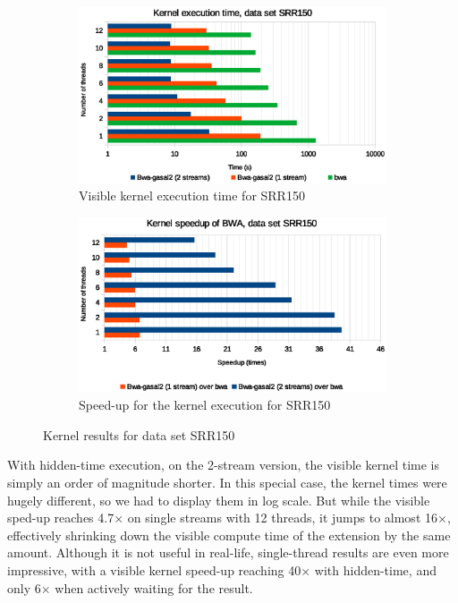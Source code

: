 \begin{figure}[p]
	\centering
	\begin{subfigure}[t]{1\textwidth}
		\centering
		\includegraphics[width=1\textwidth]{srr150/kernel-exec-time-srr150}
		\caption{Visible kernel execution time for SRR150}
		\label{fig:kernel-exec-time-srr150}
	\end{subfigure}%
	
	\begin{subfigure}[b]{1\textwidth}
		\centering
		\includegraphics[width=1\textwidth]{srr150/kernel-exec-speed-up-srr150}
		\caption{Speed-up for the kernel execution for SRR150}
		\label{fig:kernel-exec-speed-up-srr150}
	\end{subfigure}
	\caption{Kernel results for data set SRR150}
\end{figure}

With hidden-time execution, on the 2-stream version, the visible kernel time is simply an order of magnitude shorter. In this special case, the kernel times were hugely different, so we had to display them in log scale. But while the visible sped-up reaches 4.7$\times$ on single streams with 12 threads, it jumps to almost 16$\times$, effectively shrinking down the visible compute time of the extension by the same amount. Although it is not useful in real-life, single-thread results are even more impressive, with a visible kernel speed-up reaching 40$\times$ with hidden-time, and only 6$\times$ when actively waiting for the result.


